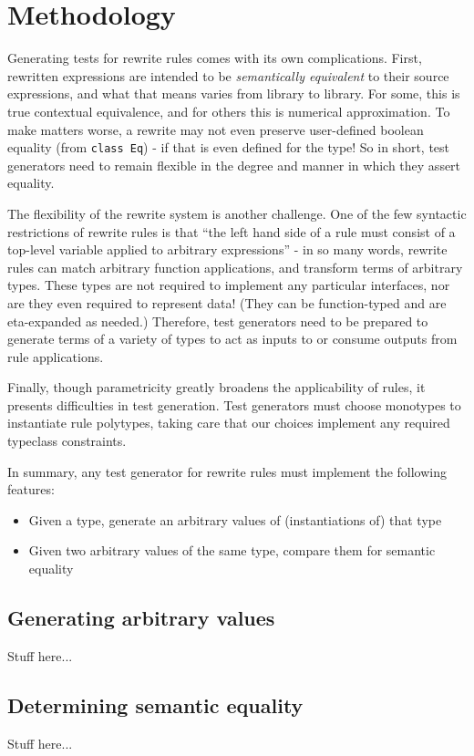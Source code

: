 \section{Methodology}
\label{sec:methodology}

Generating tests for rewrite rules comes with its own complications. First, rewritten expressions are intended to be \textit{semantically equivalent} to their source expressions, and what that means varies from library to library. For some, this is true contextual equivalence, and for others this is numerical approximation. To make matters worse, a rewrite may not even preserve user-defined boolean equality (from \texttt{class Eq}) - if that is even defined for the type! So in short, test generators need to remain flexible in the degree and manner in which they assert equality.

The flexibility of the rewrite system is another challenge. One of the few syntactic restrictions of rewrite rules is that ``the left hand side of a rule must consist of a top-level variable applied to arbitrary expressions'' \cite{userguide} - in so many words, rewrite rules can match arbitrary function applications, and transform terms of arbitrary types. These types are not required to implement any particular interfaces, nor are they even required to represent data! (They can be function-typed and are eta-expanded as needed.) Therefore, test generators need to be prepared to generate terms of a variety of types to act as inputs to or consume outputs from rule applications.

Finally, though parametricity greatly broadens the applicability of rules, it presents difficulties in test generation. Test generators must choose monotypes to instantiate rule polytypes, taking care that our choices implement any required typeclass constraints.

In summary, any test generator for rewrite rules must implement the following features:

\begin{itemize}
  \item Given a type, generate an arbitrary values of (instantiations of) that type
  \item Given two arbitrary values of the same type, compare them for semantic equality
\end{itemize}

\subsection{Generating arbitrary values}

Stuff here...

\subsection{Determining semantic equality}

Stuff here...
